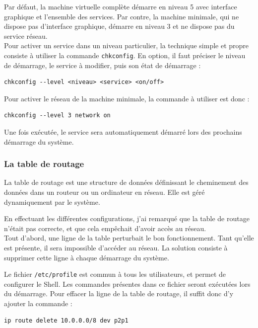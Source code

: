 Par défaut, la machine virtuelle complète démarre en niveau 5 avec interface graphique et l'ensemble des services.
Par contre, la machine minimale, qui ne dispose pas d'interface graphique, démarre en niveau 3 et ne dispose pas du service réseau.
\\


Pour activer un service dans un niveau particulier, la technique simple et propre consiste à utiliser la commande \lstinline{chkconfig}.
En option, il faut préciser le niveau de démarrage, le service à modifier, puis son état de démarrage :
\begin{lstlisting}
chkconfig --level <niveau> <service> <on/off>
\end{lstlisting}

Pour activer le réseau de la machine minimale, la commande à utiliser est donc :
\begin{lstlisting}
chkconfig --level 3 network on
\end{lstlisting}
Une fois exécutée, le service sera automatiquement démarré lors des prochains démarrage du système. 
\\




\subsubsection{La table de routage}

La table de routage est une structure de données définissant le cheminement des données dans un routeur ou un ordinateur en réseau.
Elle est géré dynamiquement par le système.

En effectuant les différentes configurations, j'ai remarqué que la table de routage n'était pas correcte, et que cela empêchait d'avoir accès au réseau.
\\


Tout d'abord, une ligne de la table perturbait le bon fonctionnement.
Tant qu'elle est présente, il sera impossible d'accéder au réseau.
La solution consiste à supprimer cette ligne à chaque démarrage du système.

Le fichier \lstinline{/etc/profile} est commun à tous les utilisateurs, et permet de configurer le Shell.
Les commandes présentes dans ce fichier seront exécutées lors du démarrage.
Pour effacer la ligne de la table de routage, il suffit donc d'y ajouter la commande :
\begin{lstlisting}
ip route delete 10.0.0.0/8 dev p2p1
\end{lstlisting}
~~\\


